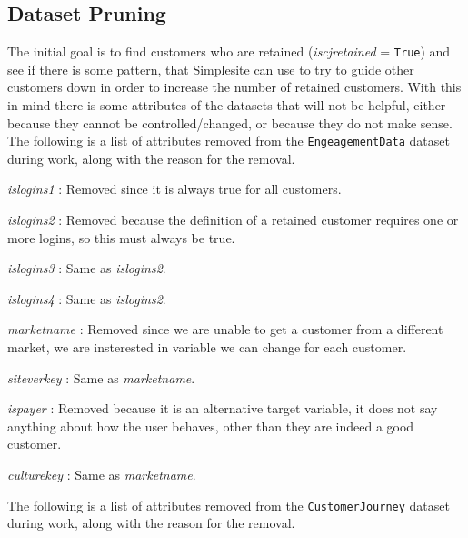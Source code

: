 \subsection{Dataset Pruning}
\label{sec:datasetpruning}

The initial goal is to find customers who are retained (\textit{iscjretained} =
\texttt{True}) and see if there is some pattern, that Simplesite can use to try
to guide other customers down in order to increase the number of retained
customers. With this in mind there is some attributes of the datasets that will
not be helpful, either because they cannot be controlled/changed, or because
they do not make sense. The following is a list of attributes removed from the
\texttt{EngeagementData} dataset during work, along with the reason for the
removal.

\begin{itemize*}
  \item \textit{islogins1} : Removed since it is always true for all customers.

	\item \textit{islogins2} : Removed because the definition of a retained
	      customer requires one or more logins, so this must always be true.

	\item \textit{islogins3} : Same as \textit{islogins2}.

	\item \textit{islogins4} : Same as \textit{islogins2}.

	\item \textit{marketname} : Removed since we are unable to get a customer from
	      a different market, we are insterested in variable we can change for
	      each customer.

	\item \textit{siteverkey} : Same as \textit{marketname}.

	\item \textit{ispayer} : Removed because it is an alternative target variable,
	      it does not say anything about how the user behaves, other than they are
	      indeed a good customer.

	\item \textit{culturekey} : Same as \textit{marketname}.
\end{itemize*}

\noindent The following is a list of attributes removed from the
\texttt{CustomerJourney} dataset during work, along with the reason for the
removal.

